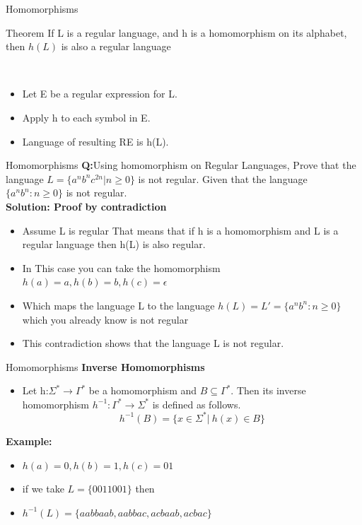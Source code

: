 \documentclass{beamer}
\begin{document}
\begin{frame}{Homomorphisms}
	\begin{block}{Theorem}
		If L is a regular language, and h is a 
		homomorphism on its alphabet, then $h(L)
	$ is also a regular 
		language
	\end{block}
\proofname \\
\begin{itemize}
	\item Let E be a regular expression for L.
	\item Apply h to each symbol in E.
	\item Language of resulting RE is h(L).
\end{itemize}
\end{frame}
\begin{frame}{Homomorphisms}
	\textbf{Q:}Using homomorphism on Regular Languages, Prove that the language $L=\{
		a^nb^nc^{2n} | n \geq 0\}$ is not regular. Given that the language $\{a^nb^n : n \geq 0 \}$ is not regular.\\
		\textbf{Solution: Proof by contradiction}
		\begin{itemize}
			\item Assume L is regular  That means that if h
			is a homomorphism and L
			is a regular language then h(L)
			is also regular.
			\item In This case you can take the homomorphism $h(a)=a
			, h(b)=b
			, h(c)=\epsilon$
			\item Which maps the language L to the language $h(L)=L'=\{a^nb^n:n\geq 0\}$  which you already know is not regular
			\item This contradiction shows that the language L is not regular.
		\end{itemize}
	
\end{frame}

\begin{frame}{Homomorphisms}
\textbf{Inverse Homomorphisms}
\begin{itemize}
	\item Let h:$\Sigma^* \rightarrow \Gamma^*$ be a homomorphism and $B\subseteq \Gamma^*$. Then its inverse homomorphism $h^{-1}:\Gamma^* \rightarrow \Sigma^*$ is defined as follows. $$h^{-1}(B) = \{x \in \Sigma^* |\  h(x)\in B\}$$
\end{itemize}
\textbf{Example:}
\begin{itemize}
	\item $h(a)=0,h(b)=1,h(c)=01$
	\item if we take $L=\{0011001\}$ then
	\item $h^{-1}(L)=\{aabbaab,aabbac,acbaab,acbac\}$
\end{itemize}
\end{frame}
\end{document}
